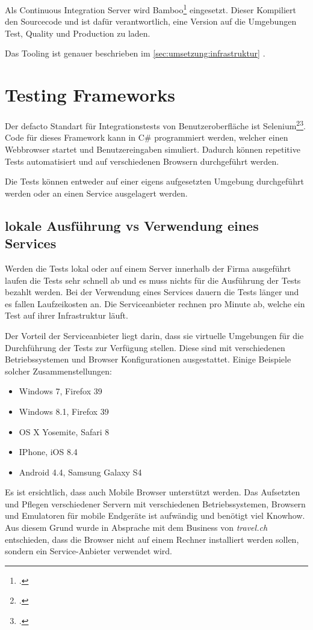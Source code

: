 Als Continuous Integration Server wird Bamboo\footcite{Bamboo_2015-07-26} eingesetzt. Dieser Kompiliert den Sourcecode und ist dafür verantwortlich, eine Version auf die Umgebungen Test, Quality und Production zu laden.

Das Tooling ist genauer beschrieben im \cref{sec:umsetzung:infrastruktur} .

\section{Testing Frameworks}
\label{sec:Recherche:TestingFrameworks}
Der defacto Standart für Integrationstests von Benutzeroberfläche ist Selenium\footcite{Selenium_-_Web_Browser_Automation_2015-07-26}\footcite{Happy_10th_Birthday_Selenium_ThoughtWorks_2015-07-26}. Code für dieses Framework kann in C\# programmiert werden, welcher einen Webbrowser startet und Benutzereingaben simuliert. Dadurch können repetitive Tests automatisiert und auf verschiedenen Browsern durchgeführt werden.

Die Tests können entweder auf einer eigens aufgesetzten Umgebung durchgeführt werden oder an einen Service ausgelagert werden.

\subsection{lokale Ausführung vs Verwendung eines Services}
\label{sec:Recherche:TestingFrameworks:vs}
Werden die Tests lokal oder auf einem Server innerhalb der Firma ausgeführt laufen die Tests sehr schnell ab und es muss nichts für die Ausführung der Tests bezahlt werden. Bei der Verwendung eines Services dauern die Tests länger und es fallen Laufzeikosten an. Die Serviceanbieter rechnen pro Minute ab, welche ein Test auf ihrer Infrastruktur läuft.

Der Vorteil der Serviceanbieter liegt darin, dass sie virtuelle Umgebungen für die Durchführung der Tests zur Verfügung stellen. Diese sind mit verschiedenen Betriebssystemen und Browser Konfigurationen ausgestattet. Einige Beispiele solcher Zusammenstellungen:
\begin{itemize}
\item Windows 7, Firefox 39
\item Windows 8.1, Firefox 39
\item OS X Yosemite, Safari 8
\item IPhone, iOS 8.4
\item Android 4.4, Samsung Galaxy S4
\end{itemize}
Es ist ersichtlich, dass auch Mobile Browser unterstützt werden. Das Aufsetzten und Pflegen verschiedener Servern mit verschiedenen Betriebssystemen, Browsern und Emulatoren für mobile Endgeräte ist aufwändig und benötigt viel Knowhow. Aus diesem Grund wurde in Absprache mit dem Business von \textit{travel.ch} entschieden, dass die Browser nicht auf einem Rechner installiert werden sollen, sondern ein Service-Anbieter verwendet wird.

